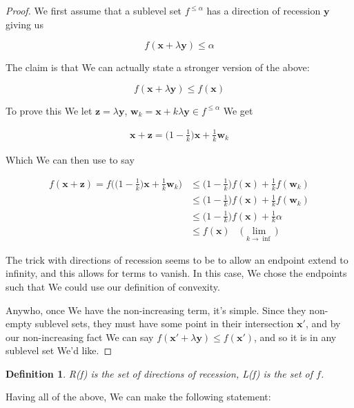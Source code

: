 \documentclass{article}
\newtheorem{definition}[theorem]{Definition}
\begin{document}
		\begin{proof}
			We first assume that a sublevel set $f^{\le\alpha}$ has a direction of recession $\mathbf{y}$ giving us
			
			\[ f(\mathbf{x} + \lambda\mathbf{y}) \le \alpha \]
			
			The claim is that We can actually state a stronger version of the above:
			
			\[ f(\mathbf{x} + \lambda\mathbf{y}) \le f(\mathbf{x}) \]
			
			To prove this We let $\mathbf{z} = \lambda\mathbf{y}$, $\mathbf{w}_k = \mathbf{x}+k\lambda\mathbf{y}\in f^{\le\alpha}$ We get
			
			\begin{align*}
				\mathbf{x}+\mathbf{z} = \bigg(1 - \frac{1}{k} \bigg)\mathbf{x} + \frac{1}{k}\mathbf{w}_k
			\end{align*}
			
			Which We can then use to say
			
			\begin{align*}
				f(\mathbf{x+z})  =  f\bigg(  \bigg(1 - \frac{1}{k} \bigg)\mathbf{x} + \frac{1}{k}\mathbf{w}_k \bigg) &\le \bigg( 1-\frac{1}{k} \bigg)f(\mathbf{x}) + \frac{1}{k}f(\mathbf{w}_k)\\
				&\le \bigg( 1-\frac{1}{k} \bigg)f(\mathbf{x}) + \frac{1}{k}f(\mathbf{w}_k)\\
				&\le \bigg( 1-\frac{1}{k} \bigg)f(\mathbf{x}) + \frac{1}{k}\alpha\\
				&\le f(\mathbf{x}) \quad \bigg( \lim_{k\to\inf}\bigg)
			\end{align*}
			
			The trick with directions of recession seems to be to allow an endpoint extend to infinity, and this allows for terms to vanish. In this case, We chose the endpoints such that We could use our definition of convexity. 
			
			Anywho, once We have the non-increasing term, it's simple. Since they non-empty sublevel sets, they must have some point in their intersection $\mathbf{x'}$, and by our non-increasing fact We can say $f(\mathbf{x'}+\lambda\mathbf{y})\le f(\mathbf{x'})$, and so it is in any sublevel set We'd like.
		\end{proof}
		
		\begin{definition}
			R(f) is the set of directions of recession, L(f) is the set of $f$.
		\end{definition}
		
		Having all of the above, We can make the following statement:
		
\end{document}
